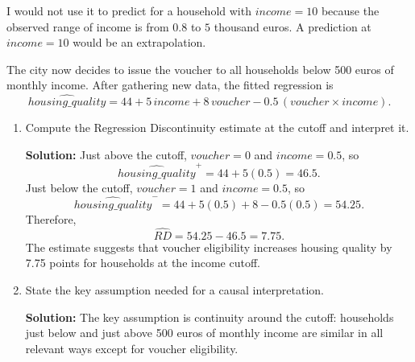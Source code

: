 \documentclass[11pt]{exam}
\begin{document}
\begin{questions}
\begin{enumerate}[leftmargin = 0.5cm, label = (\alph*), rightmargin = 0.2cm]
\begin{solutionorbox}[5cm]
    I would not use it to predict for a household with $income=10$ because the observed range of income is from $0.8$ to $5$ thousand euros. A prediction at $income=10$ would be an extrapolation.
    \end{solutionorbox}
\end{enumerate}

The city now decides to issue the voucher to all households below 500 euros of monthly income. After gathering new data, the fitted regression is
\[
\widehat{housing\_quality}=44+5\,income+8\,voucher-0.5\,(voucher\times income).
\]

\begin{enumerate}[leftmargin = 0.5cm, label = (\alph*), start = 4, rightmargin = 0.2cm]
    \item Compute the Regression Discontinuity estimate at the cutoff and interpret it.
    \begin{solutionorbox}[7cm]
    \textbf{Solution:} Just above the cutoff, $voucher=0$ and $income=0.5$, so
    \[
    \widehat{housing\_quality}^{+}=44+5(0.5)=46.5.
    \]
    Just below the cutoff, $voucher=1$ and $income=0.5$, so
    \[
    \widehat{housing\_quality}^{-}=44+5(0.5)+8-0.5(0.5)=54.25.
    \]
    Therefore,
    \[
    \widehat{RD}=54.25-46.5=7.75.
    \]
    The estimate suggests that voucher eligibility increases housing quality by 7.75 points for households at the income cutoff.
    \end{solutionorbox}

    \item State the key assumption needed for a causal interpretation.
    \begin{solutionorbox}[5cm]
    \textbf{Solution:} The key assumption is continuity around the cutoff: households just below and just above 500 euros of monthly income are similar in all relevant ways except for voucher eligibility.
    \end{solutionorbox}
\end{enumerate}

\end{questions}
\end{document}
